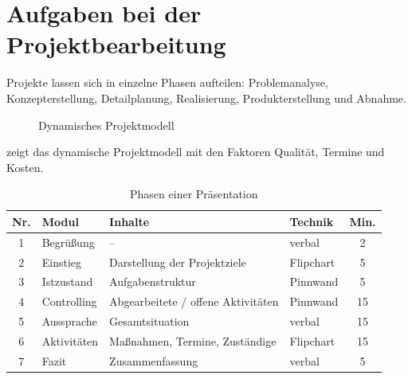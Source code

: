 \documentclass{wbh-studienheft}
\begin{document}
\section{Aufgaben bei der Projektbearbeitung}

Projekte lassen sich in einzelne Phasen aufteilen: Problemanalyse,
Konzepterstellung, Detailplanung, Realisierung, Produkterstellung und
Abnahme.

\begin{figure}[htbp]
  \centering
  \caption{Dynamisches Projektmodell}
  \label{fig:projektmodell}
\end{figure}

 zeigt das dynamische Projektmodell mit den
Faktoren Qualität, Termine und Kosten.

\begin{table}[htbp]
  \centering
  \caption{Phasen einer Präsentation}
  \label{tab:praesentation}
  \small\sffamily
  \begin{tabularx}{\textwidth}{c l X l c}
    \toprule
    \textbf{Nr.} & \textbf{Modul} & \textbf{Inhalte} & \textbf{Technik} & \textbf{Min.} \\
    \midrule
    1 & Begrüßung   & --                                  & verbal    &  2 \\
    2 & Einstieg     & Darstellung der Projektziele        & Flipchart &  5 \\
    3 & Istzustand   & Aufgabenstruktur                    & Pinnwand  &  5 \\
    4 & Controlling  & Abgearbeitete / offene Aktivitäten  & Pinnwand  & 15 \\
    5 & Aussprache   & Gesamtsituation                     & verbal    & 15 \\
    6 & Aktivitäten  & Maßnahmen, Termine, Zuständige      & Flipchart & 15 \\
    7 & Fazit        & Zusammenfassung                     & verbal    &  5 \\
    \bottomrule
  \end{tabularx}
\end{table}

\end{document}

